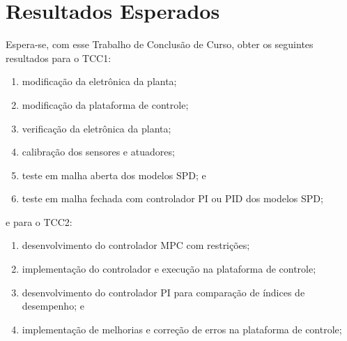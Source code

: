 
\chapter{Resultados Esperados}%
\label{chp:expected-results}

Espera-se, com esse Trabalho de Conclusão de Curso, obter os seguintes
resultados para o TCC1:

\begin{enumerate}
      \item modificação da eletrônica da planta;
      \item modificação da plataforma de controle;
      \item verificação da eletrônica da planta;
      \item calibração dos sensores e atuadores;
      \item teste em malha aberta dos modelos SPD\@; e
      \item teste em malha fechada com controlador PI ou PID dos modelos SPD\@;
\end{enumerate}

e para o TCC2:

\begin{enumerate}
      \item desenvolvimento do controlador MPC com restrições;
      \item implementação do controlador e execução na plataforma de controle;
      \item desenvolvimento do controlador PI para comparação de índices de
            desempenho; e
      \item implementação de melhorias e correção de erros na plataforma de
            controle;
\end{enumerate}
